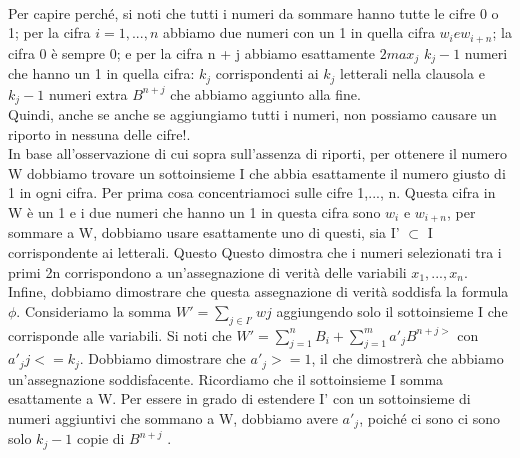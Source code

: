 \\Per capire perché, si noti che tutti i numeri da sommare hanno tutte le cifre 0 o 1; per la cifra $i = 1,..., n$ abbiamo due numeri con un 1 in quella cifra $w_i e w_{i+n}$; la cifra 0 è sempre 0; e per la cifra n + j abbiamo esattamente $2 max_j$ $k_j - 1$ numeri che hanno un 1 in quella cifra: $k_j$ corrispondenti ai $k_j$ letterali nella clausola e $k_j - 1$ numeri extra $B^{n+j}$ che abbiamo aggiunto alla fine. 
\\Quindi, anche se anche se aggiungiamo tutti i numeri, non possiamo causare un riporto in nessuna delle cifre!.
\\In base all'osservazione di cui sopra sull'assenza di riporti, per ottenere il numero W dobbiamo trovare un sottoinsieme I che abbia esattamente il numero giusto di 1 in ogni cifra. Per prima cosa concentriamoci sulle cifre 1,..., n. Questa cifra in W è un 1 e i due numeri che hanno un 1 in questa cifra sono $w_i$ e $w_{i+n}$, per sommare a W, dobbiamo usare esattamente uno di questi, sia I' $\subset$ I corrispondente ai letterali. Questo Questo dimostra che i numeri selezionati tra i primi 2n corrispondono a un'assegnazione di verità delle variabili $x_1, . . . , x_n$.
\\Infine, dobbiamo dimostrare che questa assegnazione di verità soddisfa la formula $\phi$. Consideriamo la somma $W' = \sum_{j \in I'} wj$ aggiungendo solo il sottoinsieme I che corrisponde alle variabili. Si noti che $W' = \sum_{j=1}^n B_i + \sum_{j=1}^m a'_j B^{n+j>}$ con $a'_j j <= k_j$. Dobbiamo dimostrare che $a'_j >= 1$, il che dimostrerà che abbiamo un'assegnazione soddisfacente. Ricordiamo che il sottoinsieme I somma esattamente a W. Per essere in grado di estendere I' con un sottoinsieme di numeri aggiuntivi che sommano a W, dobbiamo avere $a'_j$, poiché ci sono ci sono solo $k_j - 1$ copie di $B^{n+j}$ .
